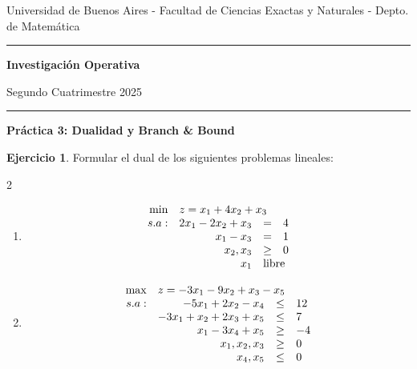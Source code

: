 \documentclass[12pt]{article}
\theoremstyle{definition}
\newtheorem{ejer}{Ejercicio}
\newcommand{\bej}{\begin{ejer}}
\newcommand{\fej}{\end{ejer}}
\begin{document}

\centerline{{\small Universidad de Buenos Aires - Facultad de Ciencias Exactas y Naturales - Depto. de Matemática}}

\vskip 0.2cm

\hrule

\vskip 0.2cm

 \centerline{{\bf\Large{\sc Investigación Operativa}}}

 \vskip 0.2cm

 \centerline{\ttfamily Segundo Cuatrimestre 2025}

\vskip 0.2cm

 \hrule

 \bigskip
 \centerline{\bf Práctica 3: Dualidad y Branch \& Bound}
 \bigskip

\bej
    Formular el dual de los siguientes problemas lineales:
    \begin{multicols}{2}
    \begin{enumerate}[label=\alph*)]
        \item \[
            \begin{array}{rrcl}
            \min & \multicolumn{2}{l}{z = x_1+4x_2+x_3} \\
            s.a: & 2x_1-2x_2+x_3 & = & 4 \\\
             & x_1-x_3 & = & 1 \\
             & x_2, x_3& \geq & 0 \\
             & x_1 & \multicolumn{2}{l}{\text{libre}}
            \end{array}
            \]
        \item \[
                \begin{array}{rrcl}
                \max & \multicolumn{2}{l}{z = -3x_1-9x_2+x_3-x_5} \\
                s.a: & -5x_1+2x_2-x_4 & \leq & 12 \\
                 & -3x_1+x_2+2x_3+x_5 & \leq & 7 \\
                 & x_1 - 3x_4 + x_5 & \geq & -4 \\
                  & x_1,x_2,x_3 & \geq & 0 \\
                  & x_4, x_5 & \leq & 0
                \end{array}
                \]
    \end{enumerate}
    \end{multicols}
\fej
\end{document}
